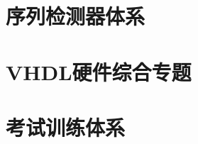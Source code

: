 \documentclass[12pt,a4paper,openany]{ctexbook}
\begin{document}


\part{序列检测器体系}



\part{VHDL硬件综合专题}



\part{考试训练体系}






\end{document}
